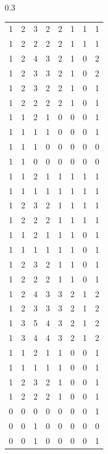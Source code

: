 \documentclass{amsart}
\theoremstyle{definition}
\theoremstyle{remark}
\numberwithin{equation}{section}
\begin{document}
\begin{table}[h]
\begin{subtable}{0.3\textwidth}
\begin{tabular}{llllllll}
1 & 2 & 3 & 2 & 2 & 1 & 1 & 1 \\
1 & 2 & 2 & 2 & 2 & 1 & 1 & 1 \\
1 & 2 & 4 & 3 & 2 & 1 & 0 & 2 \\
1 & 2 & 3 & 3 & 2 & 1 & 0 & 2 \\
1 & 2 & 3 & 2 & 2 & 1 & 0 & 1 \\
1 & 2 & 2 & 2 & 2 & 1 & 0 & 1 \\
1 & 1 & 2 & 1 & 0 & 0 & 0 & 1 \\
1 & 1 & 1 & 1 & 0 & 0 & 0 & 1 \\
1 & 1 & 1 & 0 & 0 & 0 & 0 & 0 \\
1 & 1 & 0 & 0 & 0 & 0 & 0 & 0 \\
1 & 1 & 2 & 1 & 1 & 1 & 1 & 1 \\
1 & 1 & 1 & 1 & 1 & 1 & 1 & 1 \\
1 & 2 & 3 & 2 & 1 & 1 & 1 & 1 \\
1 & 2 & 2 & 2 & 1 & 1 & 1 & 1 \\
1 & 1 & 2 & 1 & 1 & 1 & 0 & 1 \\
1 & 1 & 1 & 1 & 1 & 1 & 0 & 1 \\
1 & 2 & 3 & 2 & 1 & 1 & 0 & 1 \\
1 & 2 & 2 & 2 & 1 & 1 & 0 & 1 \\
1 & 2 & 4 & 3 & 3 & 2 & 1 & 2 \\
1 & 2 & 3 & 3 & 3 & 2 & 1 & 2 \\
1 & 3 & 5 & 4 & 3 & 2 & 1 & 2 \\
1 & 3 & 4 & 4 & 3 & 2 & 1 & 2 \\
1 & 1 & 2 & 1 & 1 & 0 & 0 & 1 \\
1 & 1 & 1 & 1 & 1 & 0 & 0 & 1 \\
1 & 2 & 3 & 2 & 1 & 0 & 0 & 1 \\
1 & 2 & 2 & 2 & 1 & 0 & 0 & 1 \\
0 & 0 & 0 & 0 & 0 & 0 & 0 & 1 \\
0 & 0 & 1 & 0 & 0 & 0 & 0 & 0 \\
0 & 0 & 1 & 0 & 0 & 0 & 0 & 1
\end{tabular}
\end{subtable}
\end{table}
\end{document}
